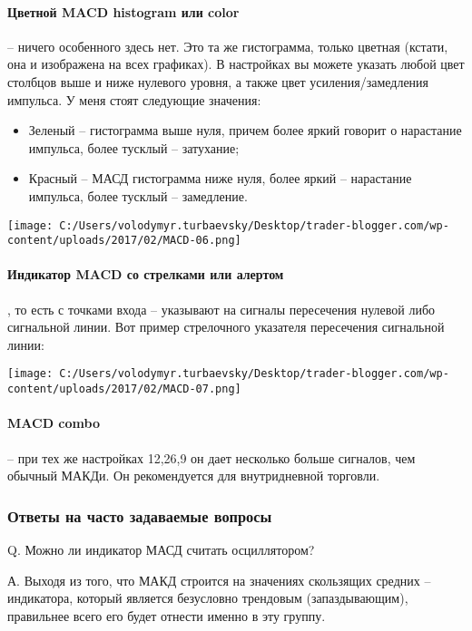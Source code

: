\documentclass[a5paper]{article}
\begin{document}
\paragraph{ Цветной MACD histogram или color} – ничего особенного здесь нет. Это та же гистограмма, только цветная (кстати, она и изображена на всех графиках). В настройках вы можете указать любой цвет столбцов выше и ниже нулевого уровня, а также цвет усиления/замедления импульса. У меня стоят следующие значения:
\begin{itemize}
\item     Зеленый – гистограмма выше нуля, причем более яркий говорит о нарастание импульса, более тусклый – затухание;
\item     Красный – МАСД гистограмма ниже нуля, более яркий –
  нарастание импульса, более тусклый – замедление.
\end{itemize}


\texttt{[image: C:/Users/volodymyr.turbaevsky/Desktop/trader-blogger.com/wp-content/uploads/2017/02/MACD-06.png]}

\paragraph{Индикатор MACD со стрелками или алертом}, то есть с точками входа – указывают на сигналы пересечения нулевой либо сигнальной линии. Вот пример стрелочного указателя пересечения сигнальной линии:

\texttt{[image: C:/Users/volodymyr.turbaevsky/Desktop/trader-blogger.com/wp-content/uploads/2017/02/MACD-07.png]}

\paragraph{MACD combo} – при тех же настройках 12,26,9 он дает
несколько больше сигналов, чем обычный МАКДи. Он рекомендуется для
внутридневной торговли.

\subsubsection{Ответы на часто задаваемые вопросы}

Q. Можно ли индикатор МАСД считать осциллятором?

А. Выходя из того, что МАКД строится на значениях скользящих средних – индикатора, который является безусловно трендовым (запаздывающим), правильнее всего его будет отнести именно в эту группу.
\end{document}
